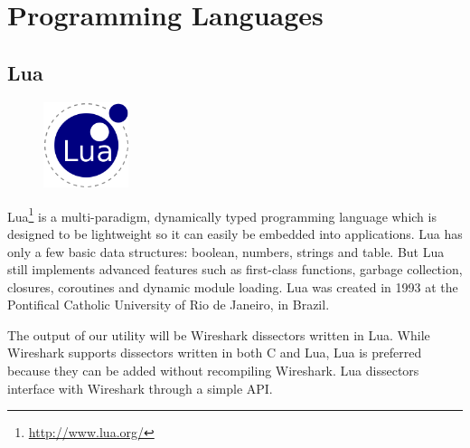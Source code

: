 \section{Programming Languages}
\label{sec:pre:langs}

\subsection{Lua}
\begin{figure}
	\begin{center}
	\vspace{-30pt}
		\includegraphics[width=2.5cm]{./planning/img/lua_logo}
	\vspace{-30pt}
	\end{center}
\end{figure}
Lua\footnote{\url{http://www.lua.org/}} is a multi-paradigm, dynamically typed
programming language which is
designed to be lightweight so it can easily be embedded into applications.
Lua has only a few basic data structures: boolean, numbers, strings and table.
But Lua still implements advanced features such as first-class functions,
garbage collection, closures, coroutines and dynamic module loading. Lua was
created in 1993 at the Pontifical Catholic University of Rio de Janeiro, in
Brazil.

The output of our utility will be Wireshark dissectors written in Lua. While
Wireshark supports dissectors written in both C and Lua, Lua is preferred
because they can be added without recompiling Wireshark. Lua dissectors
interface with Wireshark through a simple API.

